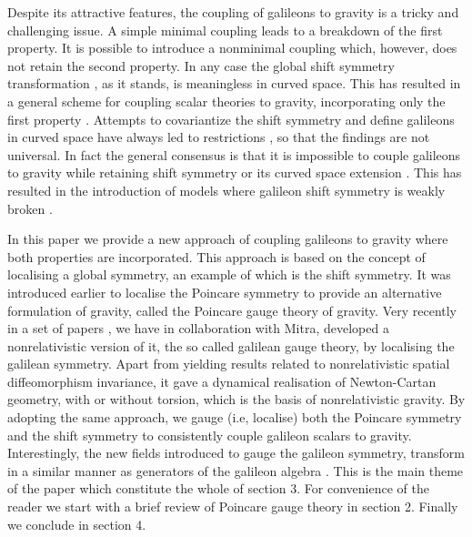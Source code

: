 \documentclass[12pt]{article}
\begin{document}
Despite its attractive features, the coupling of galileons to gravity is a tricky and challenging issue. A simple minimal coupling leads to a breakdown of the first property. It is possible to introduce a nonminimal coupling \cite{V} which, however, does not retain the second property. In any case the global shift symmetry transformation , as it stands, is meaningless in curved space. This has resulted in a general scheme for coupling scalar theories to gravity, incorporating only the first property \cite{DDE}. Attempts to covariantize the shift symmetry and define galileons in curved space have always led to restrictions \cite{GHK, G}, so that the findings are not universal. In fact the general consensus is that it is impossible to couple galileons to gravity while retaining shift symmetry or its curved space extension \cite{P}. This has resulted in the introduction of models where galileon shift symmetry is weakly broken \cite{P}.

In this paper we provide a new approach of coupling galileons to gravity where both properties are incorporated. This approach is based on the concept of localising a global symmetry, an example of which is the shift symmetry. It was introduced earlier \cite{U, HB} to localise the Poincare symmetry to provide an alternative formulation of gravity, called the Poincare gauge theory of gravity. Very recently in a set of papers \cite{MMM1, MMM2, MMM3, MM4, MM5}, we have in collaboration with Mitra, developed a nonrelativistic version of it, the so called galilean gauge theory, by localising the galilean symmetry. Apart from yielding results related to nonrelativistic spatial diffeomorphism invariance, it gave a dynamical realisation of Newton-Cartan geometry, with or without torsion, which is the basis of nonrelativistic gravity.  By adopting the same approach, we gauge (i.e, localise) both the Poincare symmetry and the shift symmetry to consistently couple galileon scalars to gravity. Interestingly, the new fields introduced to gauge the galileon symmetry, transform in a similar manner as generators of the galileon algebra \cite{GHJT}. This is the main theme of the paper which constitute the whole of section 3. For convenience of the reader we start with a brief review of Poincare gauge theory in section 2. Finally we conclude in section 4.
\end{document}
